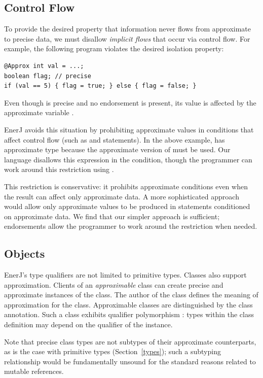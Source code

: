 \subsection{Control Flow}
To provide the desired property that information never flows from
approximate to precise data, we must disallow \emph{implicit flows} that occur
via control flow. For example, the following program
violates the desired isolation property:
\begin{lstlisting}
@Approx int val = ...;
boolean flag; // precise
if (val == 5) { flag = true; } else { flag = false; }
\end{lstlisting}
Even though  is precise and no endorsement is
present, its value is affected by the approximate variable .

EnerJ avoids this situation by prohibiting approximate values in
conditions that affect control flow (such as  and
 statements).
In the
above example,  has approximate type
because the approximate version of \ilcode{==} must be used. Our
language disallows this expression in the condition, though the
programmer can work around this restriction using
.

This restriction is conservative: it prohibits approximate conditions even
when the result can affect only approximate data. A more sophisticated
approach would allow only approximate values to be produced in statements
conditioned on approximate data. We find that our simpler approach
is sufficient; endorsements allow the programmer to work around the
restriction when needed.

\subsection{Objects}
\label{objects}
EnerJ's type qualifiers are not limited to primitive types.
Classes also support approximation.
Clients of an \emph{approximable} class can create
precise and approximate instances of the class. The author of the
class defines the meaning of approximation for the class.
Approximable classes are distinguished by the 
class annotation. Such a class exhibits qualifier polymorphism
\cite{qualifiers}: types within the class definition
may depend on the qualifier of the instance.

Note that precise class types are not subtypes of their approximate
counterparts, as is the case with primitive types (Section~\ref{types});
such a subtyping relationship would be fundamentally unsound for the
standard reasons related to mutable references.

